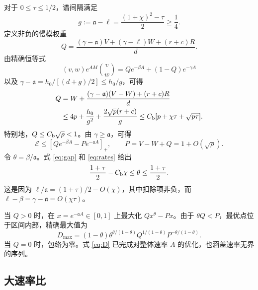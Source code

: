 \documentclass[aps,pra,reprint,amsmath,amssymb,nofootinbib,floatfix,longbibliography]{revtex4-2}
\theoremstyle{aps}
\begin{document}
对于 $0\le\tau\le1/2$，谱间隔满足
\begin{equation}\label{eq:gap}
 g:=\mathfrak a-\ell=\frac{(1+\chi)^2-\tau}{2}\ge\frac14.
\end{equation}
定义非负的慢模权重
\begin{equation}\label{eq:Qweight}
 Q=\frac{(\gamma-\mathfrak a)V+(\gamma-\ell)W+(r+c)R}{d}.
\end{equation}
由精确恒等式
\begin{equation}\label{eq:twoexp}
 (v,w)e^{AM}\binom vw=Qe^{-\beta A}+(1-Q)e^{-\gamma A}
\end{equation}
以及 $\gamma-\mathfrak a=h_0/[(d+g)/2]\le h_0/g$，可得
\begin{align}
 Q&=W+\frac{(\gamma-\mathfrak a)(V-W)+(r+c)R}{d}\nonumber\\
 &\le4p+\frac{h_0}{g^2}+\frac{2\sqrt p(r+c)}g
 \le C_{\rm b}[p+\chi\tau+\sqrt{p\tau}].\label{eq:Qbound}
\end{align}
特别地，$Q\le C_{\rm b}\sqrt\rho<1$。由 $\gamma\ge\mathfrak a$，可得
\begin{equation}\label{eq:scalarbound}
 \mathcal E\le[Qe^{-\beta A}-Pe^{-\mathfrak a A}]_+,
 \qquad P=V-W+Q=1+O(\sqrt\rho).
\end{equation}
令 $\theta=\beta/\mathfrak a$。式 \eqref{eq:gap} 和 \eqref{eq:rates} 给出
\begin{equation}\label{eq:theta}
 \frac{1+\tau}{2}-C_{\rm b}\chi\le\theta\le\frac{1+\tau}{2}.
\end{equation}
这是因为 $\ell/\mathfrak a=(1+\tau)/2-O(\chi)$，其中扣除项非负，而 $\ell-\beta=\gamma-\mathfrak a=O(\chi\tau)$。

当 $Q>0$ 时，在 $x=e^{-\mathfrak a A}\in[0,1]$ 上最大化 $Qx^\theta-Px$。由于 $\theta Q<P$，最优点位于区间内部，精确最大值为
\begin{equation}\label{eq:D}
 D_{\max}=(1-\theta)\theta^{\theta/(1-\theta)}
 Q^{1/(1-\theta)}P^{-\theta/(1-\theta)}.
\end{equation}
当 $Q=0$ 时，包络为零。式 \eqref{eq:D} 已完成对整体速率 $A$ 的优化，也涵盖速率无界的序列。

\subsection{大速率比}
\end{document}
